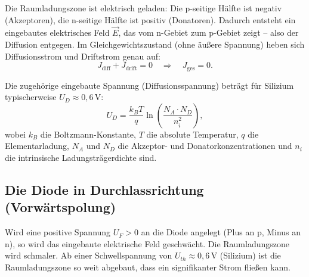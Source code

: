 ﻿\documentclass[12pt, a4paper]{article}
\begin{document}
	Die Raumladungszone ist elektrisch geladen: Die p-seitige Hälfte ist negativ
	(Akzeptoren), die n-seitige Hälfte ist positiv (Donatoren). Dadurch entsteht
	ein eingebautes elektrisches Feld $\vec{E}$, das vom n-Gebiet zum p-Gebiet
	zeigt -- also der Diffusion entgegen. Im Gleichgewichtszustand (ohne äußere
	Spannung) heben sich Diffusionsstrom und Driftstrom genau auf:
	\begin{equation}
		J_{\mathrm{diff}} + J_{\mathrm{drift}} = 0 \quad \Rightarrow \quad J_{\mathrm{ges}} = 0.
	\end{equation}
	
	Die zugehörige eingebaute Spannung (Diffusionsspannung) beträgt für Silizium
	typischerweise $U_D \approx 0{,}6\,\mathrm{V}$:
	\begin{equation}
		U_D = \frac{k_B T}{q} \ln\!\left(\frac{N_A \cdot N_D}{n_i^2}\right),
	\end{equation}
	wobei $k_B$ die Boltzmann-Konstante, $T$ die absolute Temperatur, $q$ die
	Elementarladung, $N_A$ und $N_D$ die Akzeptor- und Donatorkonzentrationen und
	$n_i$ die intrinsische Ladungsträgerdichte sind.
	
	\subsection{Die Diode in Durchlassrichtung (Vorwärtspolung)}
	
	Wird eine positive Spannung $U_F > 0$ an die Diode angelegt (Plus an p, Minus
	an n), so wird das eingebaute elektrische Feld geschwächt. Die Raumladungszone
	wird schmaler. Ab einer Schwellspannung von $U_{th} \approx 0{,}6\,\mathrm{V}$
	(Silizium) ist die Raumladungszone so weit abgebaut, dass ein signifikanter
	Strom fließen kann.
	
\end{document}
